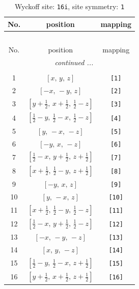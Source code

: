 \documentclass[fleqn,8pt]{jsarticle}
\begin{document}
\begin{longtable}{ccc}
\caption{Wyckoff site: {\tt 16i}, site symmetry: {\tt 1}}
 \\
 \hline \hline
No. & position & mapping \\ \hline \endfirsthead

\multicolumn{2}{l}{\tablename\ \thetable{}} \\
 \hline \hline
No. & position & mapping \\ \hline \endhead

 \hline \hline
\multicolumn{2}{r}{\footnotesize\it continued ...} \\ \endfoot

 \hline \hline
\multicolumn{2}{r}{} \\ \endlastfoot

1 & $\left[ x,\, y,\, z \right]$ & {\tt [1]} \\ \hline
2 & $\left[ - x,\, - y,\, z \right]$ & {\tt [2]} \\ \hline
3 & $\left[ y + \frac{1}{2},\, x + \frac{1}{2},\, \frac{1}{2} - z \right]$ & {\tt [3]} \\ \hline
4 & $\left[ \frac{1}{2} - y,\, \frac{1}{2} - x,\, \frac{1}{2} - z \right]$ & {\tt [4]} \\ \hline
5 & $\left[ y,\, - x,\, - z \right]$ & {\tt [5]} \\ \hline
6 & $\left[ - y,\, x,\, - z \right]$ & {\tt [6]} \\ \hline
7 & $\left[ \frac{1}{2} - x,\, y + \frac{1}{2},\, z + \frac{1}{2} \right]$ & {\tt [7]} \\ \hline
8 & $\left[ x + \frac{1}{2},\, \frac{1}{2} - y,\, z + \frac{1}{2} \right]$ & {\tt [8]} \\ \hline
9 & $\left[ - y,\, x,\, z \right]$ & {\tt [9]} \\ \hline
10 & $\left[ y,\, - x,\, z \right]$ & {\tt [10]} \\ \hline
11 & $\left[ x + \frac{1}{2},\, \frac{1}{2} - y,\, \frac{1}{2} - z \right]$ & {\tt [11]} \\ \hline
12 & $\left[ \frac{1}{2} - x,\, y + \frac{1}{2},\, \frac{1}{2} - z \right]$ & {\tt [12]} \\ \hline
13 & $\left[ - x,\, - y,\, - z \right]$ & {\tt [13]} \\ \hline
14 & $\left[ x,\, y,\, - z \right]$ & {\tt [14]} \\ \hline
15 & $\left[ \frac{1}{2} - y,\, \frac{1}{2} - x,\, z + \frac{1}{2} \right]$ & {\tt [15]} \\ \hline
16 & $\left[ y + \frac{1}{2},\, x + \frac{1}{2},\, z + \frac{1}{2} \right]$ & {\tt [16]} \\
\end{longtable}
\end{document}
